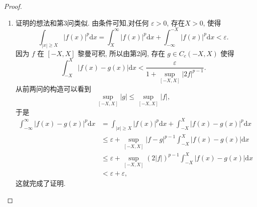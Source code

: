 \documentclass[../../main.tex]{subfiles}%
\begin{document}
\begin{proof}
\begin{enumerate}[(1)]
\item 证明的想法和第3问类似. 由条件可知,对任何 $\varepsilon > 0$, 存在$X > 0$, 使得
\[
\int_{|x| \geqslant X} |f(x)|^{p}\mathrm{d}x=
\int_{X}^{\infty} |f(x)|^{p}\mathrm{d}x + \int_{-\infty}^{-X} |f(x)|^{p}\mathrm{d}x < \varepsilon.
\]
因为 $f$ 在 $[-X,X]$ 黎曼可积, 所以由第2问, 存在 $g \in C_c(-X,X)$ 使得
\[
\int_{-X}^{X} |f(x) - g(x)|\mathrm{d}x < \frac{\varepsilon}{1 + \sup_{[-X,X]} |2f|^{p - 1}}.
\]
从前两问的构造可以看到
\[
\sup_{[-X,X]} |g| \leqslant \sup_{[-X,X]} |f|,
\]
于是
\begin{align*}
\int_{-\infty}^{\infty} |f(x) - g(x)|^{p}\mathrm{d}x &= \int_{|x| \geqslant X} |f(x)|^{p}\mathrm{d}x + \int_{-X}^{X} |f(x) - g(x)|^{p}\mathrm{d}x \\
&\leqslant \varepsilon + \sup_{[-X,X]} |f - g|^{p - 1} \int_{-X}^{X} |f(x) - g(x)|\mathrm{d}x \\
&\leqslant \varepsilon + \sup_{[-X,X]} (2|f|)^{p - 1} \int_{-X}^{X} |f(x) - g(x)|\mathrm{d}x \\
&< \varepsilon + \varepsilon,
\end{align*}
这就完成了证明. 
\end{enumerate}

\end{proof}
\end{document}
